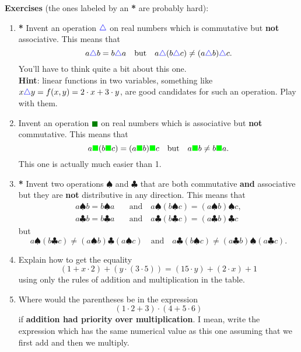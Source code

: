 \documentclass[a4paper,11pt]{article}
\newcommand{\tb}{\textcolor{blue}}
\newcommand{\tg}{\textcolor{green}}
\begin{document}
\textbf{Exercises} (the ones labeled by an \textbf{*} are probably hard):
\begin{enumerate}[label=\arabic*.,topsep=0pt]
 \item \textbf{*} Invent an operation $\tb{\triangle}$ on real numbers which is
  commutative but \textbf{not} associative. This means that
  \[
   a \tb{\triangle} b = b \tb{\triangle} a  \quad \text{but} \quad a
   \tb{\triangle} (b \tb{\triangle} c) \neq (a \tb{\triangle} b) \tb{\triangle}
   c.
  \]
  You'll have to think quite a bit about this one.\\ \textbf{Hint}: linear
  functions in two variables, something like $x\tb{\triangle}y = f(x,y) = 2
  \cdot x + 3 \cdot y$, are good candidates for such an operation. Play with
  them.

 \item Invent an operation \tg{$\blacksquare$} on real numbers which is
  associative but \textbf{not} commutative. This means that
  \[
   a \tg{\blacksquare} (b \tg{\blacksquare} c) = (a \tg{\blacksquare} b)
   \tg{\blacksquare} c \quad \text{but} \quad a \tg{\blacksquare} b \neq b
   \tg{\blacksquare} a.
  \]
  This one is actually much easier than 1.

 \item \textbf{*} Invent two operations $\spadesuit$ and $\clubsuit$ that are
  both commutative \textbf{and} associative but they are \textbf{not}
  distributive in any direction. This means that
  \begin{align*}
   a \spadesuit b = b \spadesuit a  \quad &\text{and} \quad a \spadesuit (b
   \spadesuit c) = (a \spadesuit b) \spadesuit c, \\ 
   a \clubsuit b = b \clubsuit a \quad &\text{and} \quad a \clubsuit (b
   \clubsuit c) = (a \clubsuit b) \clubsuit c
  \end{align*}
  but
  \[
   a \spadesuit (b \clubsuit c) \neq (a \spadesuit b) \clubsuit (a \spadesuit
   c) \quad \text{and} \quad  a \clubsuit (b \spadesuit c) \neq (a \clubsuit b)
   \spadesuit (a \clubsuit c).
  \]
 \item Explain how to get the equality
  \[
   (1 + x \cdot 2) + (y \cdot (3 \cdot 5)) = (15 \cdot y) + (2 \cdot x) + 1
  \]
  using only the rules of addition and multiplication in the table.
 \item Where would the parentheses be in the expression
  \[
   (1 \cdot 2 + 3) \cdot (4 + 5 \cdot 6)
  \]
  if \textbf{addition had priority over multiplication}. I mean, write the
  expression which has the same numerical value as this one assuming that we
  first add and then we multiply.
\end{enumerate}
\end{document}
